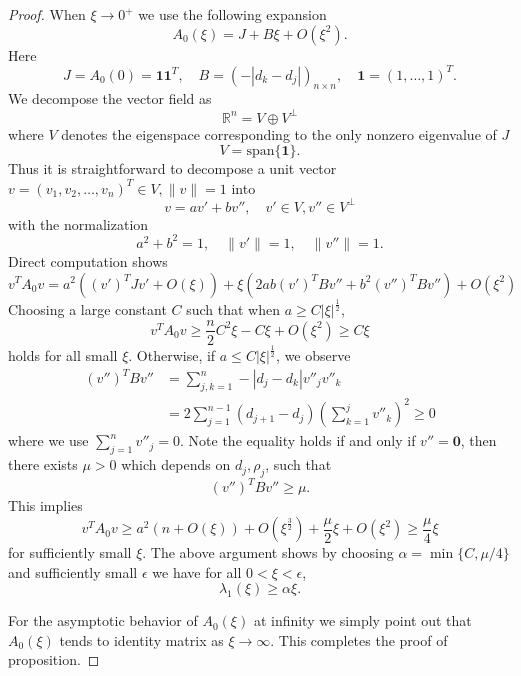 \documentclass[10pt,a4paper]{amsart}
\begin{document}
\begin{proof}
    When $\xi\rightarrow0^+$ we use the following expansion
    \begin{equation}
        A_0(\xi)=J+B\xi+O(\xi^2).
    \end{equation}
    Here
    \begin{equation}
        J=A_0(0)=\textbf{1}\textbf{1}^T,\quad B=(-|d_k-d_j|)_{n\times n},\quad \textbf{1}=(1,\dots,1)^T.
    \end{equation}
    We decompose the vector field as
    \begin{equation}
        \mathbb{R}^n=V\oplus V^{\perp}
    \end{equation}
    where $V$ denotes the eigenspace corresponding to the only nonzero eigenvalue of $J$
    \begin{equation}
        V=\text{span}\{\textbf{1}\}.
    \end{equation}
    Thus it is straightforward to decompose a unit vector $v=(v_1,v_2,\dots,v_n)^T\in V,\|v\|=1$ into
    \begin{equation}
        v=av'+bv'',\quad v'\in V,v''\in V^{\perp}
    \end{equation}
    with the normalization
    \begin{equation}
        a^2+b^2=1,\quad \|v'\|=1,\quad \|v''\|=1.
    \end{equation}
Direct computation shows
\begin{equation}
    v^TA_0v=a^2\left((v')^TJv'+O(\xi)\right)+\xi\left(2ab(v')^TBv''+b^2(v'')^TBv''\right)+O(\xi^2)
\end{equation}
Choosing a large  constant $C$ such that when $a\geq C|\xi|^{\frac{1}{2}}$,
\begin{equation}
    v^TA_0v\geq \frac{n}{2}C^2\xi-C\xi+O(\xi^2)\geq C\xi
\end{equation}
holds for all small $\xi$. Otherwise, if  $a\leq C|\xi|^{\frac{1}{2}}$, we observe   \begin{align}
        (v'')^TBv''&=\sum_{j,k=1}^n-|d_j-d_k|v''_jv''_k\\
        &=2\sum_{j=1}^{n-1}(d_{j+1}-d_j)\left(\sum_{k=1}^jv''_k\right)^2\geq 0
    \end{align}
    where we use $\sum_{j=1}^nv''_j=0$. Note the equality holds if and only if $v''=\textbf{0}$, then there exists $\mu>0$ which depends on $d_j,\rho_j$, such that
    \begin{equation}
        (v'')^TBv''\geq\mu. 
    \end{equation}
    This implies
    \begin{equation}
        v^TA_0v\geq a^2(n+O(\xi))+O(\xi^{\frac{3}{2}})+\frac{\mu}{2}\xi+O(\xi^2)\geq \frac{\mu}{4}\xi
    \end{equation}
    for sufficiently small $\xi$. The above argument shows by choosing $\alpha=\min\{C,\mu/4\}$ and sufficiently small  $\epsilon$ we have for all $0<\xi<\epsilon$,
    \begin{equation}
        \lambda_1(\xi)\geq\alpha\xi.
    \end{equation}

    For the asymptotic behavior of $A_0(\xi)$ at infinity we simply point out that $A_0(\xi)$ tends to identity matrix as $\xi\rightarrow\infty$. This completes the proof of proposition.
\end{proof}
\end{document}
